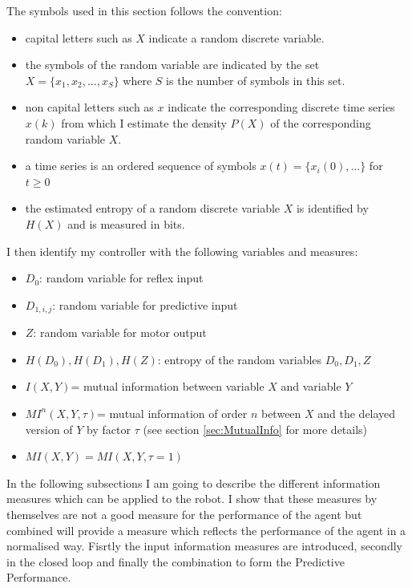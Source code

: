 The symbols used in this section follows the convention:
\begin{itemize}
\item capital letters such as $X$ indicate a random discrete variable.
\item the symbols of the random variable are indicated by the set
  $X=\{x_1,x_2,...,x_S\}$ where $S$ is the number of symbols in this
set.
\item non capital letters such as $x$ indicate the corresponding
  discrete time series $x(k)$ from which I estimate the density
  $P(X)$ of the corresponding random variable $X$.
\item a time series is an ordered sequence of symbols
  $x(t)=\{x_i(0),... \}$ for $t \geq 0$
\item the estimated entropy of a random discrete variable $X$ is
  identified by $H(X)$ and is measured in bits.
\end{itemize}
I then identify my controller with the following variables and
measures:
\begin{itemize}
 \item $D_{0}$: random variable for reflex input
 \item $D_{1,i,j}$: random variable for predictive input
 \item $Z$: random variable for motor output
 \item $H( D_{0} ),H(D_{1}),H(Z)$: entropy of the random variables $D_0,D_1,Z$
 \item $I(X,Y)$= mutual information between variable $X$ and variable $Y$
 \item $MI^n(X,Y,\tau)$= mutual information of order $n$ between $X$ and 
	the delayed version of $Y$ by factor $\tau$ (see section \ref{sec:MutualInfo} for more details)
 \item $MI(X,Y)=MI(X,Y,\tau=1)$ 
\end{itemize}


In the following subsections I am going to describe the different information measures
 which can be applied to the robot.
I show that these measures by themselves are not a good measure for the performance of 
the agent but combined will provide a measure which reflects the performance of the 
agent in a normalised way.
Fisrtly the input information measures are introduced, secondly in the closed loop
 and finally the combination to form the Predictive Performance.

